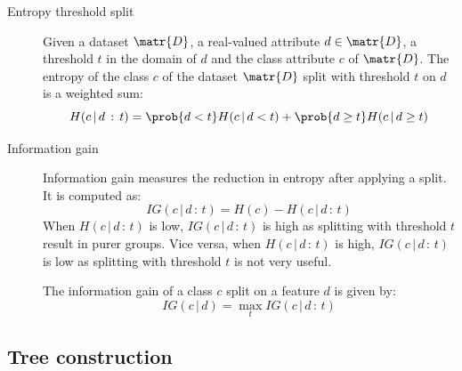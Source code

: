 \begin{description}
    \item[Entropy threshold split] 
        Given a dataset $\matr{D}$, 
        a real-valued attribute $d \in \matr{D}$,
        a threshold $t$ in the domain of $d$ and
        the class attribute $c$ of $\matr{D}$.
        The entropy of the class $c$ of the dataset $\matr{D}$ split with threshold $t$ on $d$ is a weighted sum:
        \[ H(c \,\vert\, d \,:\, t) = \prob{d < t}H(c \,\vert\, d < t) + \prob{d \geq t}H(c \,\vert\, d \geq t) \]

    \item[Information gain] 
        Information gain measures the reduction in entropy after applying a split.
        It is computed as:
        \[ IG(c \,\vert\, d \,:\, t) = H(c) - H(c \,\vert\, d \,:\, t) \]
        When $H(c \,\vert\, d \,:\, t)$ is low, $IG(c \,\vert\, d \,:\, t)$ is high 
        as splitting with threshold $t$ result in purer groups.
        Vice versa, when $H(c \,\vert\, d \,:\, t)$ is high, $IG(c \,\vert\, d \,:\, t)$ is low
        as splitting with threshold $t$ is not very useful.

        The information gain of a class $c$ split on a feature $d$ is given by:
        \[ IG(c \,\vert\, d) = \max_t IG(c \,\vert\, d \,:\, t) \]
\end{description}


\subsection{Tree construction}

